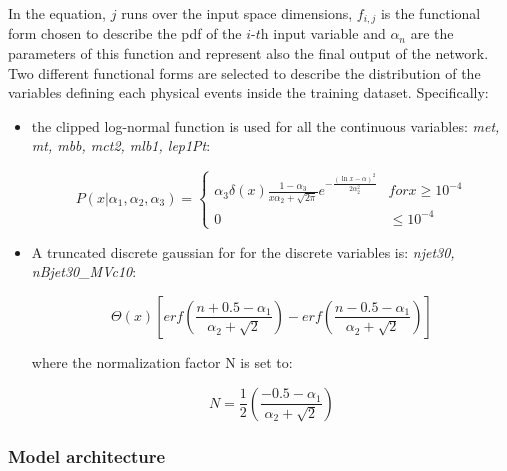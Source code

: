 In the equation, $\textit{j}$ runs over the input space dimensions, $\textit{$f_{i,j}$}$ is the functional form chosen to describe the pdf of the $\textit{i-th}$ input variable and $\alpha_{n}$ are the parameters of this function and represent also the final output of the network. Two different functional forms are selected to describe the distribution of the variables defining each physical events inside the training dataset. Specifically:

\begin{itemize}

\item the clipped log-normal function is used for all the continuous variables: \textit{met, mt, mbb, mct2, mlb1, lep1Pt}:

\begin{equation}\label{eq:4}
  P\left(x| \alpha_{1}, \alpha_{2},\alpha_{3} \right) =
    \begin{cases}
      \alpha_{3}\delta \left( x \right) \frac{1 - \alpha_{3}}{x\alpha_{2}+\sqrt{2\pi}} e^{-\frac{\left(\ln x -\alpha\right)^{2}}{2\alpha_{2}^{2}}}& for x \geq 10^{-4} \\
      0 & \leq 10^{-4}
 
    \end{cases}       
\end{equation}

\item A truncated discrete gaussian for for the discrete variables is: \textit{njet30, nBjet30\_MVc10}:

\begin{equation}\label{eq:5}
\Theta \left( x \right) \left[ erf \left(
          \frac{n + 0.5 - \alpha_{1}}{\alpha_{2}+\sqrt{2}}\right)
         - erf \left(\frac{n - 0.5 - \alpha_{1}}{\alpha_{2}+\sqrt{2}}\right)
\right]
\end{equation}

where the normalization factor N is set to:

\begin{equation}\label{eq:6}
N = \frac{1}{2}\left(
          \frac{-0.5 -\alpha_{1}}{\alpha_{2}+\sqrt{2}}\right)
\end{equation}

\end{itemize}

\subsubsection{Model architecture}
\label{subsubsec:model_architecture}

